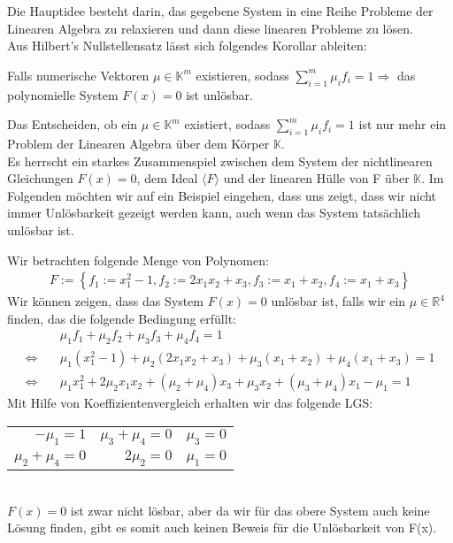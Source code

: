 Die Hauptidee besteht darin, das gegebene System in eine Reihe Probleme der Linearen Algebra zu relaxieren und dann diese linearen Probleme zu lösen. \\
Aus Hilbert's Nullstellensatz lässt sich folgendes Korollar ableiten:
\begin{corollary}
Falls numerische Vektoren $\mu \in \mathbb{K}^m$ existieren, sodass $\sum_{i=1}^m \mu_i f_i = 1 \Rightarrow $ das polynomielle System $F(x) = 0$ ist unlösbar. 
\end{corollary}
\noindent Das Entscheiden, ob ein $\mu \in \mathbb{K}^m$ existiert, sodass $\sum_{i=1}^m \mu_i f_i = 1$ ist nur mehr ein Problem der Linearen Algebra über dem Körper $\mathbb{K}$. \\
Es herrscht ein starkes Zusammenspiel zwischen dem System der nichtlinearen Gleichungen $F(x) = 0$, dem Ideal $\langle F \rangle$ und der linearen Hülle von F über $\mathbb{K}$. 
\noindent Im Folgenden möchten wir auf ein Beispiel eingehen, dass uns zeigt, dass wir nicht immer Unlösbarkeit gezeigt werden kann, auch wenn das System tatsächlich unlösbar ist.
\begin{example} \label{ex1}
Wir betrachten folgende Menge von Polynomen:
\begin{align*}
F := \left\{f_1 := x_1^2-1, f_2 := 2x_1x_2+x_3,f_3:=x_1+x_2,f_4:=x_1+x_3 \right\}
\end{align*}
Wir können zeigen, dass das System $F(x)=0$ unlösbar ist, falls wir ein $\mu \in \mathbb{R}^4$ finden, das die folgende Bedingung erfüllt:
\begin{align*}
&\mu_1 f_1 + \mu_2 f_2 + \mu_3 f_3 + \mu_4 f_4 = 1 \\
\Leftrightarrow \quad &\mu_1(x_1^2-1)+\mu_2(2x_1x_2+x_3)+\mu_3(x_1+x_2)+\mu_4(x_1+x_3)=1 \\
\Leftrightarrow \quad &\mu_1x_1^2+2\mu_2x_1x_2+(\mu_2+\mu_4)x_3+\mu_3x_2+(\mu_3+\mu_4)x_1-\mu_1 = 1
\end{align*}
Mit Hilfe von Koeffizientenvergleich erhalten wir das folgende LGS:
\begin{table}[h]
\begin{center}
\begin{tabular}{rrr}
$-\mu_1=1$ & $\mu_3+\mu_4=0$ & $\mu_3=0$ \\
$\mu_2+\mu_4=0$ & $2\mu_2=0$ & $\mu_1=0$ 
\end{tabular}
\end{center}
\end{table}
\\
$F(x)= 0$ ist zwar nicht lösbar, aber da wir für das obere System auch keine Lösung finden, gibt es somit auch keinen Beweis für die Unlösbarkeit von F(x).

\end{example}

